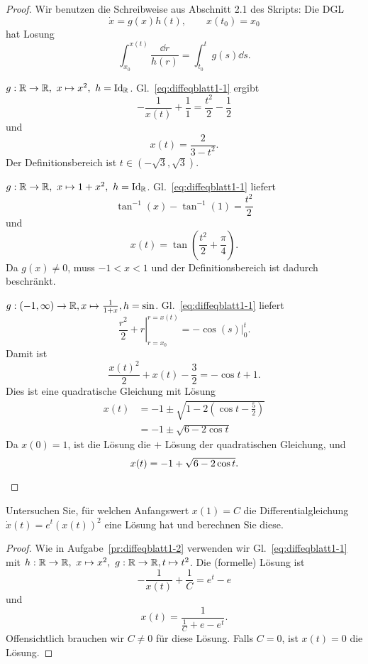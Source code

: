 \begin{proof}
	Wir benutzen die Schreibweise aus Abschnitt 2.1 des Skripts: Die DGL
	\[\dot{x}=g(x)h(t),\qquad x(t_0)=x_0\]
	hat Losung
	\begin{equation}\label{eq:diffeqblatt1-1}
	\int_{x_0}^{x(t)}\frac{\dd{r}}{h(r)}=\int_{t_0}^t g(s)\dd{s}
	.\end{equation}
	\begin{parts}
	\item $g:\mathbb{R}\to \mathbb{R},~x\mapsto x^2,~h=\text{Id}_{\mathbb{R}}$. Gl.~\eqref{eq:diffeqblatt1-1} ergibt
		\[
		-\frac{1}{x(t)}+\frac{1}{1}=\frac{t^2}{2}-\frac{1}{2}
		\] 
		und
		\[
		x(t)=\frac{2}{3-t^2}
		.\] 
		Der Definitionsbereich ist $t\in (-\sqrt{3} , \sqrt{3} )$.
	\item $g:\mathbb{R} \to \mathbb{R},~x\mapsto 1+x^2,~h=\text{Id}_{\mathbb{R}}$. Gl.~\eqref{eq:diffeqblatt1-1} liefert
		\[
	\tan^{-1}(x)-\tan^{-1}(1)=\frac{t^2}{2}
		\]
		und
		\[
		x(t)=\tan\left( \frac{t^2}{2}+\frac{\pi}{4} \right)
		.\] 
		Da $g(x)\neq 0$, muss $-1< x < 1 $ und der Definitionsbereich ist dadurch beschränkt.
	\item $g:(-1,\infty)\to \mathbb{R}, x\mapsto \frac{1}{1+x}, h=\sin$. Gl.~\eqref{eq:diffeqblatt1-1} liefert
		\[
		\left. \frac{r^2}{2}+r\right|_{r=x_0}^{r=x(t)}=\left. -\cos(s)\right|_0^t
		.\] 
		Damit ist
		\[
		\frac{x(t)^2}{2}+x(t)-\frac{3}{2}=-\cos t + 1
		.\] 
		Dies ist eine quadratische Gleichung mit Lösung
		\begin{align*}
		x(t)&=-1\pm \sqrt{1-2\left( \cos t - \frac{5}{2} \right)}\\
		&=-1\pm \sqrt{6-2\cos t} 
	\end{align*}
	Da $x(0)=1$, ist die Lösung die $+$ Lösung der quadratischen Gleichung, und
	\[
	x(t)=-1+\sqrt{6-2\cos t} 
	.\qedhere\] 
	\end{parts}
\end{proof}
\begin{Problem}
	Untersuchen Sie, für welchen Anfangswert $x(1)=C$ die Differentialgleichung $\dot{x}(t)=e^t(x(t))^2$ eine Lösung hat und berechnen Sie diese.
\end{Problem}
\begin{proof}
	Wie in Aufgabe~\ref{pr:diffeqblatt1-2} verwenden wir Gl.~\eqref{eq:diffeqblatt1-1} mit $h:\mathbb{R} \to \mathbb{R},~x\mapsto x^2,~g:\mathbb{R} \to \mathbb{R}, t\mapsto t^2$. Die (formelle) Lösung ist
	\[
	-\frac{1}{x(t)}+\frac{1}{C}=e^t-e
	\] 
	und
	\[
	x(t)=\frac{1}{\frac{1}{C}+e-e^t}
	.\] 
	Offensichtlich brauchen wir $C\neq 0$ für diese Lösung. Falls $C=0$, ist $x(t)=0$ die Lösung.
\end{proof}
